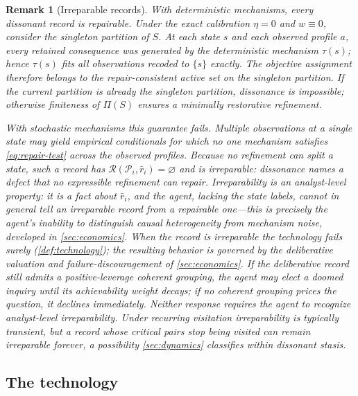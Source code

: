 \documentclass[11pt]{article}
\newtheorem{remark}[assumption]{Remark}
\theoremstyle{definition}
\newcommand{\emptysetset}{\varnothing}
\begin{document}
\begin{remark}[Irreparable records]
\label{rem:irreparable}
With deterministic mechanisms, every dissonant record is repairable.
Under the exact calibration $\eta=0$ and $w\equiv0$, consider the singleton partition of $S$.
At each state $s$ and each observed profile $a$, every retained consequence was generated by the deterministic mechanism $\tau(s)$; hence $\tau(s)$ fits all observations recoded to $\{s\}$ exactly.
The objective assignment therefore belongs to the repair-consistent active set on the singleton partition.
If the current partition is already the singleton partition, dissonance is impossible; otherwise finiteness of $\Pi(S)$ ensures a minimally restorative refinement.

With stochastic mechanisms this guarantee fails.
Multiple observations at a single state may yield empirical conditionals for which no one mechanism satisfies \cref{eq:repair-test} across the observed profiles.
Because no refinement can split a state, such a record has $\mathcal R(\mathcal P_i,\bar r_i)=\emptysetset$ and is \emph{irreparable}: dissonance names a defect that no expressible refinement can repair.
Irreparability is an analyst-level property: it is a fact about $\bar r_i$, and the agent, lacking the state labels, cannot in general tell an irreparable record from a repairable one---this is precisely the agent's inability to distinguish causal heterogeneity from mechanism noise, developed in \cref{sec:economics}.
When the record is irreparable the technology fails surely (\cref{def:technology}); the resulting behavior is governed by the deliberative valuation and failure-discouragement of \cref{sec:economics}.
If the deliberative record still admits a positive-leverage coherent grouping, the agent may elect a doomed inquiry until its achievability weight decays; if no coherent grouping prices the question, it declines immediately.
Neither response requires the agent to recognize analyst-level irreparability.
Under recurring visitation irreparability is typically transient, but a record whose critical pairs stop being visited can remain irreparable forever, a possibility \cref{sec:dynamics} classifies within dissonant stasis.
\end{remark}

\subsection{The technology}
\end{document}

